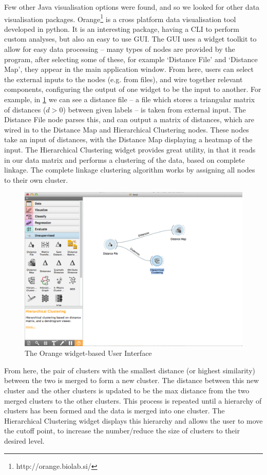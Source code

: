 Few other Java visualisation options were found, and so we looked for other
data visualisation packages. Orange\footnote{http://orange.biolab.si/} is a cross platform data
visualisation tool developed in python. It is an interesting package, having
a CLI to perform custom analyses, but also an easy to use GUI. The GUI uses
a widget toolkit to allow for easy data processing -- many types of nodes
are provided by the program, after selecting some of these, for example `Distance
File' and `Distance Map', they appear in the main application window. From here,
users can select the external inputs to the nodes (e.g. from files), and wire
together relevant components, configuring the output of one widget to be the
input to another. For example, in \cref{fig:orangeUI} we can see a distance file
-- a file which stores a triangular matrix of distances ($d>0$) between given labels --
is taken from external input. The Distance File node parses this, and can output
a matrix of distances, which are wired in to the Distance Map and Hierarchical Clustering
nodes. These nodes take an input of distances, with the Distance Map displaying a heatmap
of the input. The Hierarchical Clustering widget provides great utility, in that
it reads in our data matrix and performs a clustering of the data, based on
complete linkage. The complete linkage clustering algorithm works by assigning
all nodes to their own cluster. 
\begin{figure}[H]
	\centering
		\includegraphics[width=\textwidth]{Figures/OrangeUI}
	\caption{The Orange widget-based User Interface}
	\label{fig:orangeUI}
\end{figure}
From here, the pair of clusters with the smallest
distance (or highest similarity) between the two is merged to form a new cluster.
The distance between this new cluster and the other clusters is updated to be
the max distance from the two merged clusters to the other clusters. This process
is repeated until a hierarchy of clusters has been formed and the data is merged
into one cluster. The Hierarchical Clustering widget displays this hierarchy
and allows the user to move the cutoff point, to increase the number/reduce the
size of clusters to their desired level.


